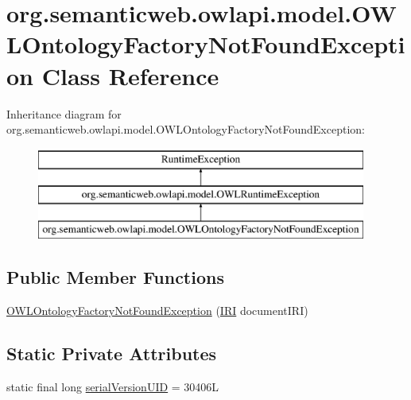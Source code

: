 \hypertarget{classorg_1_1semanticweb_1_1owlapi_1_1model_1_1_o_w_l_ontology_factory_not_found_exception}{\section{org.\-semanticweb.\-owlapi.\-model.\-O\-W\-L\-Ontology\-Factory\-Not\-Found\-Exception Class Reference}
\label{classorg_1_1semanticweb_1_1owlapi_1_1model_1_1_o_w_l_ontology_factory_not_found_exception}
}
Inheritance diagram for org.\-semanticweb.\-owlapi.\-model.\-O\-W\-L\-Ontology\-Factory\-Not\-Found\-Exception\-:\begin{figure}[H]
\begin{center}
\leavevmode
\includegraphics[height=3.000000cm]{classorg_1_1semanticweb_1_1owlapi_1_1model_1_1_o_w_l_ontology_factory_not_found_exception}
\end{center}
\end{figure}
\subsection*{Public Member Functions}
\begin{DoxyCompactItemize}
\item 
\hyperlink{classorg_1_1semanticweb_1_1owlapi_1_1model_1_1_o_w_l_ontology_factory_not_found_exception_a86f93ccb4bb8a7e716aec5aef45b2319}{O\-W\-L\-Ontology\-Factory\-Not\-Found\-Exception} (\hyperlink{classorg_1_1semanticweb_1_1owlapi_1_1model_1_1_i_r_i}{I\-R\-I} document\-I\-R\-I)
\end{DoxyCompactItemize}
\subsection*{Static Private Attributes}
\begin{DoxyCompactItemize}
\item 
static final long \hyperlink{classorg_1_1semanticweb_1_1owlapi_1_1model_1_1_o_w_l_ontology_factory_not_found_exception_a32c5cfec377e6ddbbe6d60f5f715c9ea}{serial\-Version\-U\-I\-D} = 30406\-L
\end{DoxyCompactItemize}


